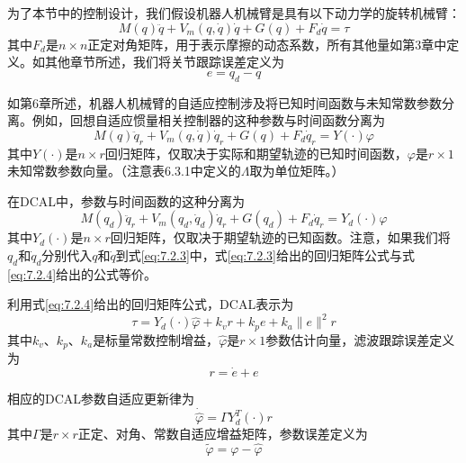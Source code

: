 \documentclass[UTF8]{ctexart}
\begin{document}
为了本节中的控制设计，我们假设机器人机械臂是具有以下动力学的旋转机械臂：
\begin{equation}\label{eq:7.2.1}
M(q)\ddot{q} + V_m(q,\dot{q})\dot{q} + G(q) + F_d\dot{q} = \tau
\end{equation}
其中$F_d$是$n \times n$正定对角矩阵，用于表示摩擦的动态系数，所有其他量如第3章中定义。如其他章节所述，我们将关节跟踪误差定义为
\begin{equation}\label{eq:7.2.2}
e = q_d - q
\end{equation}

如第6章所述，机器人机械臂的自适应控制涉及将已知时间函数与未知常数参数分离。例如，回想自适应惯量相关控制器的这种参数与时间函数分离为
\begin{equation}\label{eq:7.2.3}
M(q)\ddot{q}_r + V_m(q,\dot{q})\dot{q}_r + G(q) + F_d\dot{q}_r = Y(\cdot)\varphi
\end{equation}
其中$Y(\cdot)$是$n \times r$回归矩阵，仅取决于实际和期望轨迹的已知时间函数，$\varphi$是$r \times 1$未知常数参数向量。（注意表6.3.1中定义的$\Lambda$取为单位矩阵。）

在DCAL中，参数与时间函数的这种分离为
\begin{equation}\label{eq:7.2.4}
M(q_d)\ddot{q}_r + V_m(q_d,\dot{q}_d)\dot{q}_r + G(q_d) + F_d\dot{q}_r = Y_d(\cdot)\varphi
\end{equation}
其中$Y_d(\cdot)$是$n \times r$回归矩阵，仅取决于期望轨迹的已知函数。注意，如果我们将$q_d$和$\dot{q}_d$分别代入$q$和$\dot{q}$到式\eqref{eq:7.2.3}中，式\eqref{eq:7.2.3}给出的回归矩阵公式与式\eqref{eq:7.2.4}给出的公式等价。

利用式\eqref{eq:7.2.4}给出的回归矩阵公式，DCAL表示为
\begin{equation}\label{eq:7.2.5}
\tau = Y_d(\cdot)\hat{\varphi} + k_v r + k_p e + k_a \|e\|^2 r
\end{equation}
其中$k_v$、$k_p$、$k_a$是标量常数控制增益，$\hat{\varphi}$是$r \times 1$参数估计向量，滤波跟踪误差定义为
\begin{equation}\label{eq:7.2.6}
r = \dot{e} + e
\end{equation}

相应的DCAL参数自适应更新律为
\begin{equation}\label{eq:7.2.7}
\dot{\hat{\varphi}} = \Gamma Y_d^T(\cdot) r
\end{equation}
其中$\Gamma$是$r \times r$正定、对角、常数自适应增益矩阵，参数误差定义为
\begin{equation}\label{eq:7.2.8}
\tilde{\varphi} = \varphi - \hat{\varphi}
\end{equation}
\end{document}
